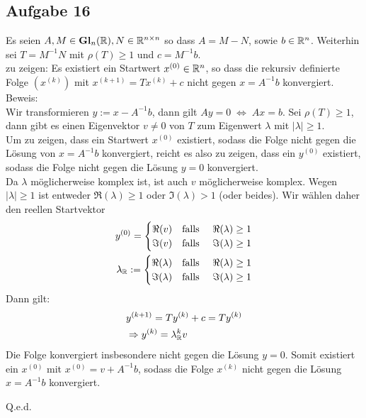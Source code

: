\subsection*{Aufgabe 16}

Es seien $A,M \in \mathbf{Gl}_n(\mathbb R), N \in \mathbb R^{n\times n}$ so dass $A=M-N$, sowie $b \in \mathbb R^n$. Weiterhin sei $T=M^{-1}N$ mit $\rho(T)\ge 1$ und $c=M^{-1}b$.\\
zu zeigen: Es existiert ein Startwert $x^{(0)} \in \mathbb R^n$, so dass die rekursiv definierte Folge $(x^{(k)})$ mit $x^{(k+1)}=Tx^{(k)}+c$ nicht gegen $x=A^{-1}b$ konvergiert.\\
\newline
Beweis:\\
Wir transformieren $y := x - A^{-1} b$, dann gilt $A y = 0 \; \Leftrightarrow \; A x = b$.
Sei $\rho(T)\ge 1$, dann gibt es einen Eigenvektor $v \neq 0$ von $T$ zum Eigenwert $\lambda$ mit $|\lambda|\ge 1$.\\
\newline
Um zu zeigen, dass ein Startwert $x^{(0)}$ existiert, sodass die Folge nicht gegen die Lösung von $x=A^{-1}b$ konvergiert, reicht es also zu zeigen, dass ein $y^{(0)}$ existiert, sodass die Folge nicht gegen die Lösung $y=0$ konvergiert.\\
\newline
Da $\lambda$ möglicherweise komplex ist, ist auch $v$ möglicherweise komplex. Wegen
$|\lambda| \ge 1$ ist entweder $\Re(\lambda) \ge 1$ oder $\Im(\lambda) > 1$ (oder beides).
Wir wählen daher den reellen Startvektor
\begin{align*}
  y^{(0)} = \begin{cases}
             \Re(v) \quad \text{falls } &\Re(\lambda) \ge 1\\
             \Im(v) \quad \text{falls } &\Im(\lambda) \ge 1\\
           \end{cases} \\
  \lambda_\mathbb R := \begin{cases}
             \Re(\lambda) \quad \text{falls } &\Re(\lambda) \ge 1\\
             \Im(\lambda) \quad \text{falls } &\Im(\lambda) \ge 1\\
           \end{cases}
\end{align*}
Dann gilt:
\begin{align*}
&y^{(k+1)}=Ty^{(k)}+ {c}=Ty^{(k)}\\
&\Rightarrow y^{(k)}=\lambda_\mathbb R^kv
\end{align*}
Die Folge konvergiert insbesondere nicht gegen die Lösung $y = 0$.
Somit existiert ein $x^{(0)}$ mit $x^{(0)}=v+A^{-1}b$, sodass die
Folge $x^{(k)}$ nicht gegen die Lösung $x=A^{-1}b$ konvergiert.
\begin{flushright}
Q.e.d.
\end{flushright}
